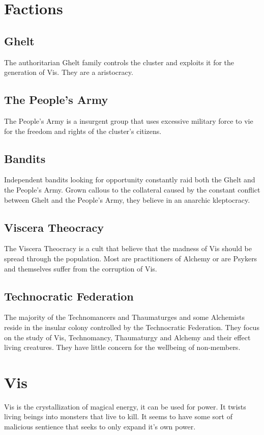 \documentclass[a4paper,12pt,oneside]{book}
\begin{document}
        \section{Factions}
            \subsection{Ghelt}
                The authoritarian Ghelt family controls the cluster and exploits it for the generation of Vis. They are a aristocracy.

            \subsection{The People's Army}
                The People's Army is a insurgent group that uses excessive military force to vie for the freedom and rights of the cluster's citizens.

            \subsection{Bandits}
                Independent bandits looking for opportunity constantly raid both the Ghelt and the People's Army. Grown callous to the collateral caused by the constant conflict between Ghelt and the People's Army, they believe in an anarchic kleptocracy.

            \subsection{Viscera Theocracy}
                The Viscera Theocracy is a cult that believe that the madness of Vis should be spread through the population. Most are practitioners of Alchemy or are Psykers and themselves suffer from the corruption of Vis.

            \subsection{Technocratic Federation}
                The majority of the Technomancers and Thaumaturges and some Alchemists reside in the insular colony controlled by the Technocratic Federation. They focus on the study of Vis, Technomancy, Thaumaturgy and Alchemy and their effect living creatures. They have little concern for the wellbeing of non-members.
            
        \section{Vis}
            Vis is the crystallization of magical energy, it can be used for power. It twists living beings into monsters that live to kill. It seems to have some sort of malicious sentience that seeks to only expand it's own power.
\end{document}
